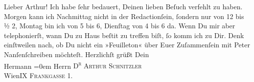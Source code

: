 \begin{ledgroupsized}[t]{13cm}
           \pstart\center{}Lieber Arthur!\pend\pstart
           Ich habe ſehr bedauert, Deinen lieben Beſuch verfehlt zu haben. Morgen kann ich
               Nachmittag nicht in der Redactionſein, ſondern nur von 12 bis ½ 2, Montag bin ich
               von 5 bis 6, Dienſtag von 4 bis 6 da. Wenn Du mir aber telephonierſt, wann Du zu Haus
                  beſti{\geminationm}t {\pb}zu treffen
               biſt, ſo komm ich zu Dir. Denk einſtweilen nach, ob Du nicht ein »Feuilleton« über
               Euer Zuſammenſein mit Peter Nanſenſchreiben möchteſt. Herzlichſt grüßt\pend
           \pstart
           Dein{\\[\baselineskip]}\spacefill\mbox{Hermann}\pend
           \leftskip=0em{}\pstart
           \noindent{}Herrn \textsc{D\textsuperscript{r} Arthur Schnitzler}{\\}WienIX \textsc{Frankgasse} 1.\pend
           \pstart
           \textcolor{gray}{\textbf{\label{T_L00584-1v}\label{T_L00584-1h}}}\pend
           
         
         \endnumbering{}\end{ledgroupsized}  \newcommand{\dateiname}{L00584}\newcommand{\titel}{Hermann Bahr an Arthur Schnitzler, 4. 9. 1896}\newcommand{\editorInnen}{ Kurt Ifkovits,  Martin Anton Müller}
      